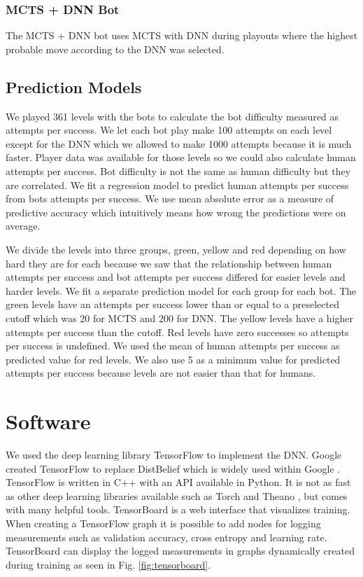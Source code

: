 \documentclass{kththesis}
\begin{document}
\subsubsection{MCTS + DNN Bot}
The MCTS + DNN bot uses MCTS with DNN during playouts where the highest probable move according to the DNN was selected.

\subsection{Prediction Models}
We played 361 levels with the bots to calculate the bot difficulty measured as attempts per success. We let each bot play make 100 attempts on each level except for the DNN which we allowed to make 1000 attempts because it is much faster. Player data was available for those levels so we could also calculate human attempts per success. Bot difficulty is not the same as human difficulty but they are correlated. We fit a regression model to predict human attempts per success from bots attempts per success. We use mean absolute error as a measure of predictive accuracy which intuitively means how wrong the predictions were on average.

We divide the levels into three groups, green, yellow and red depending on how hard they are for each because we saw that the relationship between human attempts per success and bot attempts per success differed for easier levels and harder levels. We fit a separate prediction model for each group for each bot. The green levels have an attempts per success lower than or equal to a preselected cutoff which was 20 for MCTS and 200 for DNN. The yellow levels  have a higher attempts per success than the cutoff. Red levels have zero successes so attempts per success is undefined. We used the mean of human attempts per success as predicted value for red levels. We also use 5 as a minimum value for predicted attempts per success because levels are not easier than that for humans.

\section{Software}
We used the deep learning library TensorFlow to implement the DNN. Google created TensorFlow to replace DistBelief which is widely used within Google \cite{abadi2016tensorflow}. TensorFlow is written in C++ with an API available in Python. It is not as fast as other deep learning libraries available such as Torch and Theano \cite{bahrampour2015comparative}, but comes with many helpful tools. TensorBoard is a web interface that visualizes training. When creating a TensorFlow graph it is possible to add nodes for logging measurements such as validation accuracy, cross entropy and learning rate. TensorBoard can display the logged measurements in graphs  dynamically created during training as seen in Fig. \ref{fig:tensorboard}. 
\end{document}
